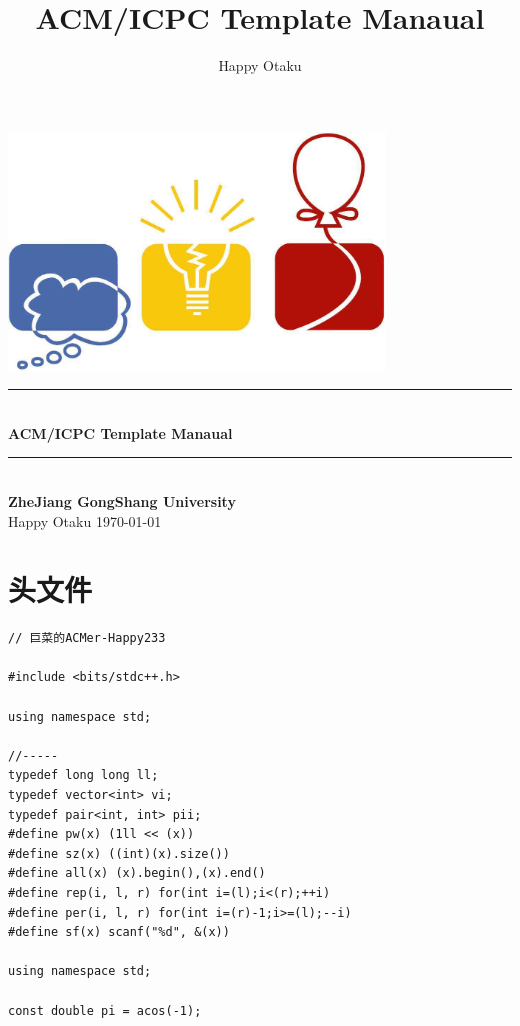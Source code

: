 \documentclass[twoside]{article}
\title{ACM/ICPC Template Manaual}
\author{Happy Otaku}
\newcommand{\HRule}{\rule{\linewidth}{0.5mm}}
\begin{document}
\small
\begin{titlepage}
\begin{center}
\vspace*{0.5cm}\includegraphics[width=0.75\textwidth]{logo.jpg} \\ [2cm]
\HRule \\ [1cm]
\textbf{\Huge{ACM/ICPC Template Manaual}} \\ [0.5cm]
\HRule \\ [4cm]
\textbf{\Huge{ZheJiang GongShang University}} \\ [1cm]
\LARGE{Happy Otaku}
\vfill
\Large{\today}
\end{center}
\clearpage
\end{titlepage}
\tableofcontents\clearpage
\pagestyle{fancy}
\lfoot{}
\cfoot{\thepage}\rfoot{}
\setcounter{section}{-1}
\setcounter{page}{1}
\clearpage\section{头文件}
\begin{lstlisting}
// 巨菜的ACMer-Happy233

#include <bits/stdc++.h>

using namespace std;

//-----
typedef long long ll;
typedef vector<int> vi;
typedef pair<int, int> pii;
#define pw(x) (1ll << (x))
#define sz(x) ((int)(x).size())
#define all(x) (x).begin(),(x).end()
#define rep(i, l, r) for(int i=(l);i<(r);++i)
#define per(i, l, r) for(int i=(r)-1;i>=(l);--i)
#define sf(x) scanf("%d", &(x))

using namespace std;

const double pi = acos(-1);\end{lstlisting}
\end{document}
